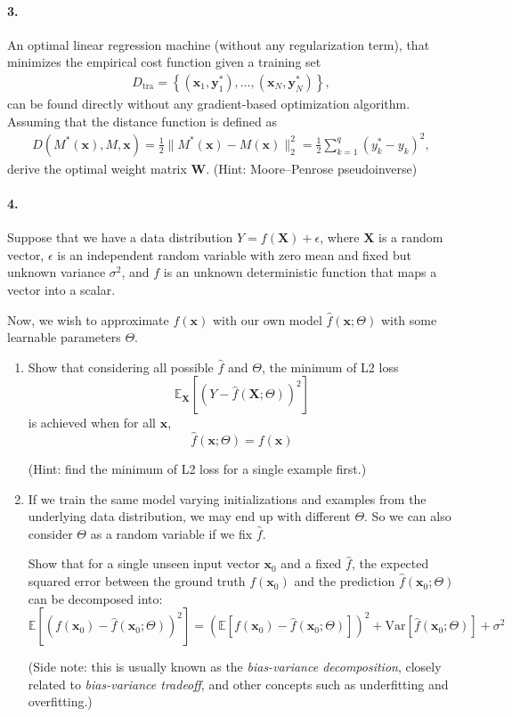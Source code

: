 \documentclass{article}
\newcommand{\vect}[1]{\mathbf{#1}}
\newcommand{\matr}[1]{\mathbf{#1}}
\newcommand{\vx}[0]{\vect{x}}
\newcommand{\vy}[0]{\vect{y}}
\newcommand{\mW}[0]{\matr{W}}
\newcommand{\E}[0]{\mathbb{E}}
\newcommand{\tra}{\text{tra}}
\begin{document}
\paragraph{3.} 

An optimal linear regression machine (without any regularization term), that
minimizes the empirical cost function given a training set 
\begin{align*}
    D_{\tra} = \left\{ 
        (\vx_1, \vy_1^*), \ldots, (\vx_N, \vy_N^*)
    \right\},
\end{align*}
can be found directly without any gradient-based optimization algorithm.
Assuming that the distance function is defined as 
\begin{align*}
    D(M^*(\vx), M, \vx) = \frac{1}{2} \|M^*(\vx) - M(\vx)\|_2^2 = 
    \frac{1}{2} \sum_{k=1}^q (y^*_k - y_k)^2,
\end{align*}
derive the optimal weight matrix $\mW$. (Hint: Moore–Penrose pseudoinverse)

%
%

\newpage

\paragraph{4.}

Suppose that we have a data distribution $Y=f(\mathbf{X}) + \epsilon$, where $\mathbf{X}$ is a random vector, $\epsilon$ is an independent random variable with zero mean and fixed but unknown variance $\sigma^2$, and $f$ is an unknown deterministic function that maps a vector into a scalar.

Now, we wish to approximate $f(\mathbf{x})$ with our own model $\hat{f}(\mathbf{x}; \Theta)$ with some learnable parameters $\Theta$.

\begin{enumerate}[label=(\alph*)]
	\item Show that considering all possible $\hat{f}$ and $\Theta$, the minimum of L2 loss $$\E_\mathbf{X}[(Y-\hat{f}(\mathbf{X}; \Theta))^2]$$ is achieved when for all $\mathbf{x}$, $$\hat{f}(\mathbf{x}; \Theta) = f(\mathbf{x})$$
	
	(Hint: find the minimum of L2 loss for a single example first.)
	\item If we train the same model varying initializations and examples from the underlying data distribution, we may end up with different $\Theta$.  So we can also consider $\Theta$ as a random variable if we fix $\hat{f}$.
	
	Show that for a single unseen input vector $\mathbf{x}_0$ and a fixed $\hat{f}$, the expected squared error between the ground truth $f(\mathbf{x}_0)$ and the prediction $\hat{f}(\mathbf{x}_0; \Theta)$ can be decomposed into:
	$$
	\E[(f(\mathbf{x}_0) - \hat{f}(\mathbf{x}_0; \Theta))^2] = \left(
	\E[f(\mathbf{x}_0) - \hat{f}(\mathbf{x}_0; \Theta)]
	\right)^2 + \mathrm{Var}[\hat{f}(\mathbf{x}_0; \Theta)] + \sigma^2
	$$
	
	(Side note: this is usually known as the \emph{bias-variance decomposition}, closely related to \emph{bias-variance tradeoff}, and other concepts such as underfitting and overfitting.)
\end{enumerate}
\end{document}
